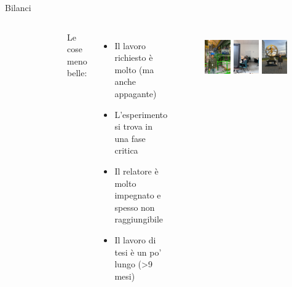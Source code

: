 \documentclass[
10pt,
aspectratio=169,
]{beamer}
\begin{document}
\begin{frame}{Bilanci}
\begin{columns}
\begin{figure}
    \end{figure}
    Le cose meno belle:
    \begin{itemize}
    \item Il lavoro richiesto è molto (ma anche appagante)
    \item L'esperimento si trova in una fase critica 
    \item Il relatore è molto impegnato e spesso non raggiungibile
    \item Il lavoro di tesi è un po' lungo (>9 mesi)
\end{itemize}
\begin{figure}
        \centering
        \includegraphics[width=0.3\textwidth]{caverna.jpeg}
                \includegraphics[width=0.3\textwidth]{ufficio.jpeg}
        \includegraphics[width=0.3\textwidth]{shiva.jpeg}

    \end{figure}
\end{columns}
\end{frame}
\end{document}
